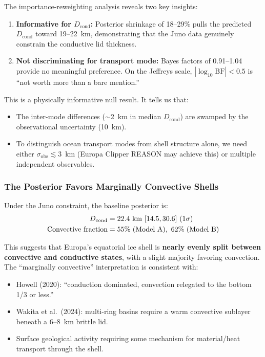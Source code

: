 \documentclass[11pt,letterpaper]{article}
\begin{document}
The importance-reweighting analysis reveals two key insights:

\begin{enumerate}
  \item \textbf{Informative for $D_\mathrm{cond}$:} Posterior shrinkage of 18--29\% pulls the predicted $D_\mathrm{cond}$ toward 19--22~km, demonstrating that the Juno data genuinely constrain the conductive lid thickness.
  \item \textbf{Not discriminating for transport mode:} Bayes factors of 0.91--1.04 provide no meaningful preference. On the Jeffreys scale, $|\log_{10}\mathrm{BF}| < 0.5$ is ``not worth more than a bare mention.''
\end{enumerate}

This is a physically informative null result. It tells us that:
\begin{itemize}[nosep]
  \item The inter-mode differences ($\sim$2~km in median $D_\mathrm{cond}$) are swamped by the observational uncertainty (10~km).
  \item To distinguish ocean transport modes from shell structure alone, we need either $\sigma_\mathrm{obs} \lesssim 3$~km (Europa Clipper REASON may achieve this) or multiple independent observables.
\end{itemize}

\subsubsection{The Posterior Favors Marginally Convective Shells}

Under the Juno constraint, the baseline posterior is:
\begin{align}
  D_\mathrm{cond} &= 22.4~\mathrm{km}~[14.5, 30.6]~(1\sigma) \notag \\
  \text{Convective fraction} &= 55\%~(\text{Model A}),~62\%~(\text{Model B})
\end{align}

This suggests that Europa's equatorial ice shell is \textbf{nearly evenly split between convective and conductive states}, with a slight majority favoring convection. The ``marginally convective'' interpretation is consistent with:
\begin{itemize}[nosep]
  \item Howell (2020): ``conduction dominated, convection relegated to the bottom 1/3 or less.''
  \item Wakita et al.\ (2024): multi-ring basins require a warm convective sublayer beneath a 6--8~km brittle lid.
  \item Surface geological activity requiring some mechanism for material/heat transport through the shell.
\end{itemize}
\end{document}
